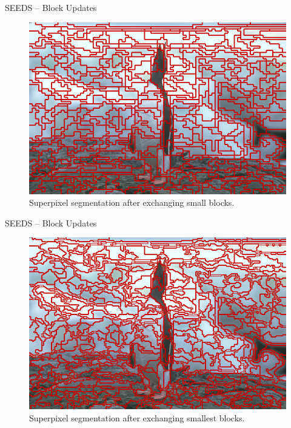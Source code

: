 \documentclass[handout]{beamer}
\begin{document}
	\begin{frame}{SEEDS -- Block Updates}
		\begin{figure}
   			\centering
   			\includegraphics[scale=0.5]{images/bsd-2-after-2}
   			\caption{Superpixel segmentation after exchanging small blocks.}
   		\end{figure}
	\end{frame}
	
	\begin{frame}{SEEDS -- Block Updates}
		\begin{figure}
   			\centering
   			\includegraphics[scale=0.5]{images/bsd-2-after-1}
   			\caption{Superpixel segmentation after exchanging smallest blocks.}
   		\end{figure}
	\end{frame}
\end{document}
